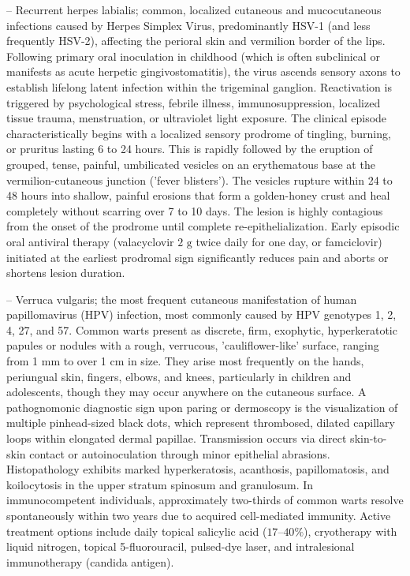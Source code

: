 -- Recurrent herpes labialis; common, localized cutaneous and mucocutaneous infections caused by Herpes Simplex Virus, predominantly HSV-1 (and less frequently HSV-2), affecting the perioral skin and vermilion border of the lips. Following primary oral inoculation in childhood (which is often subclinical or manifests as acute herpetic gingivostomatitis), the virus ascends sensory axons to establish lifelong latent infection within the trigeminal ganglion. Reactivation is triggered by psychological stress, febrile illness, immunosuppression, localized tissue trauma, menstruation, or ultraviolet light exposure. The clinical episode characteristically begins with a localized sensory prodrome of tingling, burning, or pruritus lasting 6 to 24 hours. This is rapidly followed by the eruption of grouped, tense, painful, umbilicated vesicles on an erythematous base at the vermilion-cutaneous junction ('fever blisters'). The vesicles rupture within 24 to 48 hours into shallow, painful erosions that form a golden-honey crust and heal completely without scarring over 7 to 10 days. The lesion is highly contagious from the onset of the prodrome until complete re-epithelialization. Early episodic oral antiviral therapy (valacyclovir $2\text{ g}$ twice daily for one day, or famciclovir) initiated at the earliest prodromal sign significantly reduces pain and aborts or shortens lesion duration.

-- Verruca vulgaris; the most frequent cutaneous manifestation of human papillomavirus (HPV) infection, most commonly caused by HPV genotypes 1, 2, 4, 27, and 57. Common warts present as discrete, firm, exophytic, hyperkeratotic papules or nodules with a rough, verrucous, 'cauliflower-like' surface, ranging from 1 mm to over 1 cm in size. They arise most frequently on the hands, periungual skin, fingers, elbows, and knees, particularly in children and adolescents, though they may occur anywhere on the cutaneous surface. A pathognomonic diagnostic sign upon paring or dermoscopy is the visualization of multiple pinhead-sized black dots, which represent thrombosed, dilated capillary loops within elongated dermal papillae. Transmission occurs via direct skin-to-skin contact or autoinoculation through minor epithelial abrasions. Histopathology exhibits marked hyperkeratosis, acanthosis, papillomatosis, and koilocytosis in the upper stratum spinosum and granulosum. In immunocompetent individuals, approximately two-thirds of common warts resolve spontaneously within two years due to acquired cell-mediated immunity. Active treatment options include daily topical salicylic acid ($17\text{--}40\%$), cryotherapy with liquid nitrogen, topical 5-fluorouracil, pulsed-dye laser, and intralesional immunotherapy (candida antigen).

